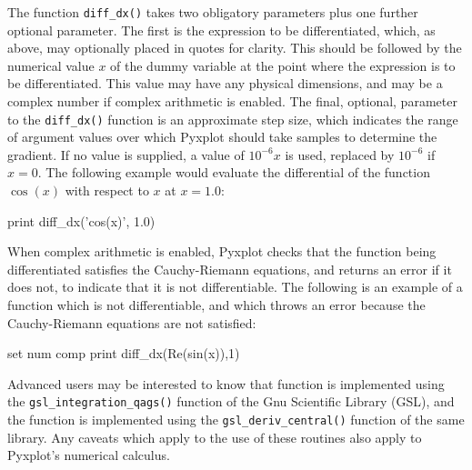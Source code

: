 The function {\tt diff\_dx()} takes two obligatory parameters plus one further
optional parameter. The first is the expression to be differentiated, which,
as above, may optionally placed in quotes for clarity. This should be followed
by the numerical value $x$ of the dummy variable at the point where the
expression is to be differentiated. This value may have any physical
dimensions, and may be a complex number if complex arithmetic is enabled. The
final, optional, parameter to the {\tt diff\_dx()} function is an approximate
step size, which indicates the range of argument values over which Pyxplot
should take samples to determine the gradient. If no value is supplied, a value
of $10^{-6}x$ is used, replaced by $10^{-6}$ if $x=0$.  The following example
would evaluate the differential of the function $\cos(x)$ with respect to $x$
at $x=1.0$:

\begin{dodo}
print diff\_dx('cos(x)', 1.0)
\end{dodo}

When complex arithmetic is enabled, Pyxplot checks that the function being
differentiated satisfies the Cauchy-Riemann equations, and returns an error if
it does not, to indicate that it is not differentiable.  The following is an
example of a function which is not differentiable, and which throws an error
because the Cauchy-Riemann equations are not satisfied:

\begin{dontdo}
set num comp\newline
print diff\_dx(Re(sin(x)),1)
\end{dontdo}

Advanced users may be interested to know that  function is
implemented using the {\tt gsl\_\-integration\_\-qags()} function of the Gnu
Scientific Library (GSL), and the  function is
implemented using the {\tt gsl\_\-deriv\_\-central()} function of the same library.
Any caveats which apply to the use of these routines also apply to Pyxplot's
numerical calculus.



